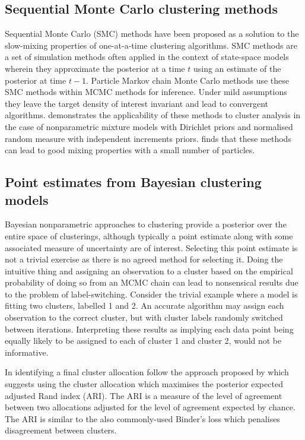 \documentclass[10pt,a4paper]{article}
\begin{document}
\subsection{Sequential Monte Carlo clustering methods}
Sequential Monte Carlo (SMC) methods have been proposed as a solution to the slow-mixing properties of one-at-a-time clustering algorithms. SMC methods are a set of simulation methods often applied in the context of state-space models wherein they approximate the posterior at  
a time $t$ using an estimate of the posterior at time $t - 1$. Particle Markov chain Monte Carlo methods\cite{andrieu2010particle} use these SMC methods within MCMC methods for inference. Under mild assumptions they leave the target density of interest invariant and lead to convergent algorithms.  demonstrates the applicability of these methods to cluster analysis in the case of nonparametric mixture models with Dirichlet priors and normalised random measure with independent increments priors. \citeauthor{griffin2014sequential} finds that these methods can lead to good mixing properties with a small number of particles.


\subsection{Point estimates from Bayesian clustering models}
Bayesian nonparametric approaches to clustering provide a posterior over the entire space of clusterings, although typically a point estimate along with some associated measure of uncertainty are of interest. Selecting this point estimate is not a trivial exercise as there is no agreed method for selecting it. Doing the intuitive thing and assigning an observation to a cluster based on the empirical probability of doing so from an MCMC chain can lead to nonsensical results due to the problem of label-switching. Consider the trivial example where a model is fitting two clusters, labelled 1 and 2. An accurate algorithm may assign each observation to the correct cluster, but with cluster labels randomly switched between iterations. Interpreting these results as implying each data point being equally likely to be assigned to each of cluster 1 and cluster 2, would not be informative.

In identifying a final cluster allocation \citeauthor{kirk2012bayesian} follow the approach proposed by \citeauthor{fritsch2009improved}\cite{fritsch2009improved} which suggests using the cluster allocation which maximises the posterior expected adjusted Rand index (ARI). The ARI is a measure of the level of agreement between two allocations adjusted for the level of agreement expected by chance. The ARI is similar to the also commonly-used Binder's loss\cite{binder1978bayesian} which penalises disagreement between clusters.
\end{document}
